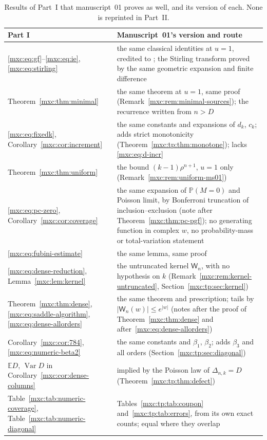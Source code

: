 \documentclass[11pt]{article}
\numberwithin{equation}{section}
\theoremstyle{definition}
\theoremstyle{remark}
\newcommand{\E}{\mathbb E}
\newcommand{\Pp}{\mathbb P}
\DeclareMathOperator{\Var}{Var}
\begin{document}
\begin{table}[htbp]
\centering\small
\renewcommand{\arraystretch}{1.12}
\begin{tabular}{@{}>{\raggedright\arraybackslash}p{}>{\raggedright\arraybackslash}p{}@{}}
\toprule
Part I & Manuscript~01's version and route\\
\midrule
\eqref{mxc:eq:gf}--\eqref{mxc:eq:ie}, \eqref{mxc:eq:stirling} &
the same classical identities at $u=1$, credited to
\cite{mpr2009}; the Stirling transform proved by the same geometric
expansion and finite difference\\
Theorem~\ref{mxc:thm:minimal} &
the same theorem at $u=1$, same proof
(Remark~\ref{mxc:rem:minimal-sources}); the recurrence written from
$n>D$\\
\eqref{mxc:eq:fixedk}, Corollary~\ref{mxc:cor:increment} &
the same constants and expansions of $d_k$, $c_k$; adds strict
monotonicity (Theorem~\ref{mxc:tp:thm:monotone}); lacks
\eqref{mxc:eq:d-incr}\\
Theorem~\ref{mxc:thm:uniform} &
the bound $(k-1)\rho^{n+1}$, $u=1$ only
(Remark~\ref{mxc:rem:uniform-ms01})\\
\eqref{mxc:eq:pc-zero}, Corollary~\ref{mxc:cor:coverage} &
the same expansion of $\Pp(M=0)$ and Poisson limit, by Bonferroni
truncation of inclusion--exclusion (note after
Theorem~\ref{mxc:thm:pc-pgf}); no generating function in complex $w$, no
probability-mass or total-variation statement\\
\eqref{mxc:eq:fubini-estimate} & the same lemma, same proof\\
\eqref{mxc:eq:dense-reduction}, Lemma~\ref{mxc:lem:kernel} &
the untruncated kernel $\mathsf W_n$, with no hypothesis on $k$
(Remark~\ref{mxc:rem:kernel-untruncated},
Section~\ref{mxc:tp:sec:kernel})\\
Theorem~\ref{mxc:thm:dense}, \eqref{mxc:eq:saddle-algorithm},
\eqref{mxc:eq:dense-allorders} &
the same theorem and prescription; tails by $|\mathsf W_n(w)|\le e^{|w|}$
(notes after the proof of Theorem~\ref{mxc:thm:dense} and
after~\eqref{mxc:eq:dense-allorders})\\
Corollary~\ref{mxc:cor:784}, \eqref{mxc:eq:numeric-beta2} &
the same constants and $\beta_1$, $\beta_2$; adds $\beta_3$ and all orders
(Section~\ref{mxc:tp:sec:diagonal})\\
$\E D$, $\Var D$ in Corollary~\ref{mxc:cor:dense-columns} &
implied by the Poisson law of $\Delta_{n,k}=D$
(Theorem~\ref{mxc:tp:thm:defect})\\
Table~\ref{mxc:tab:numeric-coverage}, Table~\ref{mxc:tab:numeric-diagonal} &
Tables~\ref{mxc:tp:tab:coupon} and~\ref{mxc:tp:tab:errors}, from its own
exact counts; equal where they overlap\\
\bottomrule
\end{tabular}
\caption{Results of Part~I that manuscript~01 proves as well, and its
version of each. None is reprinted in Part~II.}
\label{mxc:tp:tab:routes}
\end{table}
\end{document}

